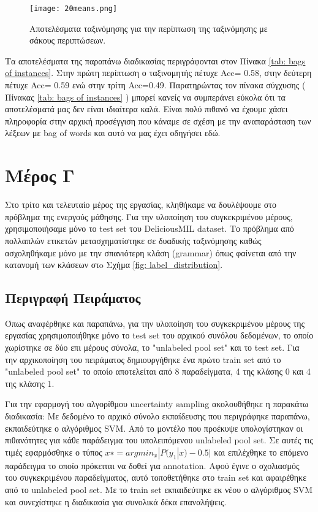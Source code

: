 \begin{figure}
	\texttt{[image: 20means.png]} %
	\caption{Αποτελέσματα ταξινόμησης για την περίπτωση της ταξινόμησης με σάκους περιπτώσεων.}
	\label{fig: bag of instances}
\end{figure}

Τα αποτελέσματα της παραπάνω διαδικασίας περιγράφονται στον Πίνακα \ref{tab: bags of instances}. Στην πρώτη περίπτωση ο ταξινομητής πέτυχε Acc= 0.58, στην δεύτερη πέτυχε Acc= 0.59 ενώ στην τρίτη Acc=0.49. Παρατηρώντας τον πίνακα σύγχυσης ( Πίνακας \ref{tab: bags of instances} ) μπορεί κανείς να συμπεράνει εύκολα ότι τα αποτελέσματά μας δεν είναι ιδιαίτερα καλά. Είναι πολύ πιθανό να έχουμε χάσει πληροφορία στην αρχική προσέγγιση που κάναμε σε σχέση με την αναπαράσταση των λέξεων με bag of words και αυτό να μας έχει οδηγήσει εδώ.

\newpage
\section{Μέρος Γ}
Στο τρίτο και τελευταίο μέρος της εργασίας, κληθήκαμε να δουλέψουμε στο πρόβλημα της ενεργούς μάθησης. Για την υλοποίηση του συγκεκριμένου μέρους, χρησιμοποιήσαμε μόνο το test set του DeliciousMIL dataset. Το πρόβλημα από πολλαπλών ετικετών μετασχηματίστηκε σε δυαδικής ταξινόμησης καθώς ασχοληθήκαμε μόνο με την σπανιότερη κλάση (grammar) όπως φαίνεται από την κατανομή των κλάσεων στo Σχήμα \ref{fig: label_distribution}. 

\subsection{Περιγραφή Πειράματος}

Όπως αναφέρθηκε και παραπάνω, για την υλοποίηση του συγκεκριμένου μέρους της εργασίας χρησιμοποιήθηκε μόνο το test set του αρχικού συνόλου δεδομένων, το οποίο χωρίστηκε σε δύο επι μέρους σύνολα, το "unlabeled pool set" και το test set. Για την αρχικοποίηση του πειράματος δημιουργήθηκε ένα πρώτο train set από το "unlabeled pool set" το οποίο αποτελείται από 8 παραδείγματα, 4 της κλάσης 0 και 4 της κλάσης 1. 

Για την εφαρμογή του αλγορίθμου uncertainty sampling ακολουθήθηκε η παρακάτω διαδικασία:
Με δεδομένο το αρχικό σύνολο εκπαίδευσης που περιγράφηκε παραπάνω, εκπαιδεύτηκε ο αλγόριθμος SVM. Από το μοντέλο που προέκυψε υπολογίστηκαν οι πιθανότητες για κάθε παράδειγμα του υπολειπόμενου unlabeled pool set. Σε αυτές τις τιμές εφαρμόσθηκε ο τύπος $ 𝑥∗=argmin_𝑥|𝑃(𝑦_1|𝑥)−0.5|$ και επιλέχθηκε το επόμενο παράδειγμα το οποίο πρόκειται να δοθεί για annotation. Αφού έγινε ο σχολιασμός του συγκεκριμένου παραδείγματος, αυτό τοποθετήθηκε στο train set και αφαιρέθηκε από το unlabeled pool set. Με το train set εκπαιδεύτηκε εκ νέου ο αλγόριθμος SVM και συνεχίστηκε η διαδικασία για συνολικά δέκα επαναλήψεις. 

